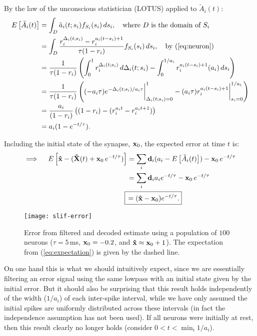 By the law of the unconscious statistician (LOTUS) applied to $\tilde{A}_i(t)$:
\begin{align}
\label{eq:a_expectation}
E \left[ \tilde{A}_i(t) \right] &= \int_D \tilde{a}_i(t; s_i) f_{S_i}(s_i) \,ds_i, \quad \text{where $D$ is the domain of $S_i$} \nonumber\\
          &= \int_D \frac{r_i^{\Delta_i(t; s_i)} - r_i^{a_i(t - s_i) + 1}}{\tau(1 - r_i)} f_{S_i}(s_i) \,ds_i, \quad \text{by (\ref{eq:neuron})} \nonumber\\
          &= \frac{1}{\tau(1 - r_i)} \left( \int_0^{1} r_i^{\Delta_i(t; s_i)} \,d\Delta_i(t; s_i) - \int_0^{1/a_i} r_i^{a_i(t - s_i) + 1} (a_i) \,ds_i \right) \nonumber\\
          &= \frac{1}{\tau(1 - r_i)} \left( (-a_i \tau) e^{-\Delta_i(t; s_i)/a_i \tau} \bigg|_{\Delta_i(t; s_i) = 0}^{1} - (a_i \tau) r_i^{a_i(t - s_i) + 1} \bigg|_{s_i = 0}^{1/a_i} \right) \nonumber\\
          &= \frac{a_i}{(1 - r_i)} \left(  (1 - r_i) - (r_i^{a_i t} - r_i^{a_i t + 1})  \right) \nonumber\\
          &= a_i (1 - e^{-t/\tau}) .
\end{align}

Including the initial state of the synapse, $\mathbf{x}_0$, the expected error at time $t$ is:
\begin{align}
\label{eq:expectation}
\implies \quad E\left[ \V{\hat{x}} - (\V{\tilde{X}}(t) + \V{x}_0 \, e^{-t/\tau}) \right] &= \sum_i \V{d}_i (a_i - E \left[ \tilde{A}_i(t) \right]) - \V{x}_0 \, e^{-t/\tau} \nonumber \\
&= \sum_i \V{d}_i a_i e^{-t/\tau} - \V{x}_0 \, e^{-t/\tau} \nonumber  \\
\Aboxed{ &\,= (\V{\hat{x}} - \V{x}_0) e^{-t/\tau} . }
\end{align}

\begin{figure}[h!]
\centering
\texttt{[image: slif-error]}
\caption{\label{fig:slif-error} Error from filtered and decoded estimate using a population of $100$ neurons ($\tau = 5$\,ms, $\mathbf{x}_0 = -0.2$, and $\mathbf{\hat{x}} \approx \mathbf{x}_0 + 1$). The expectation from (\ref{eq:expectation}) is given by the dashed line.}
\end{figure}

On one hand this is what we should intuitively expect, since we are essentially filtering an error signal using the same lowpass with an initial state given by the initial error. But it should also be surprising that this result holds independently of the width ($1 / a_i$) of each inter-spike interval, while we have only assumed the initial spikes are uniformly distributed across these intervals (in fact the independence assumption has not been used). If all neurons were initially at rest, then this result clearly no longer holds (consider $0 < t < \min_i 1/a_i$).

